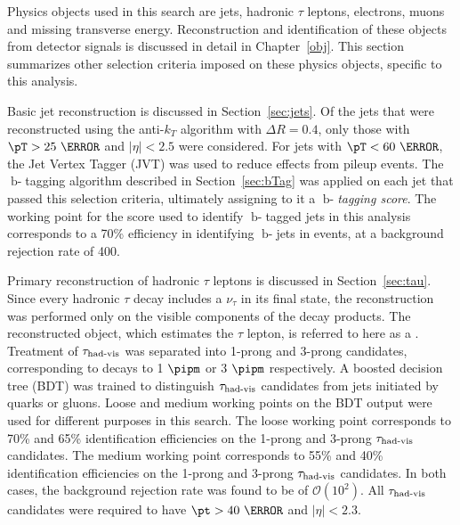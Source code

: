 \par Physics objects used in this search are jets, hadronic $\tau$ leptons, electrons, 
muons and missing transverse energy. Reconstruction and identification of these objects 
from detector signals is discussed in detail in Chapter~\ref{obj}. This section summarizes other 
selection criteria imposed on these physics objects, specific to this analysis. 

\par Basic jet reconstruction is discussed in Section~\ref{sec:jets}. Of the  
jets that were reconstructed using the anti-$k_T$ algorithm with $\Delta R=0.4$, only those 
with $\pT>25~\GeV$ and $|\eta|<2.5$ were considered. For jets with $\pT<60~\GeV$, the Jet Vertex 
Tagger (JVT) was used to reduce effects from pileup events. The $\operatorname{b-}$tagging algorithm 
described in Section~\ref{sec:bTag} was applied on each jet that passed this selection criteria, ultimately 
assigning to it a {\it $\operatorname{b-}$tagging score}. The working point for the score used to identify $\operatorname{b-}$tagged 
jets in this analysis corresponds to a 70\% efficiency in identifying $\operatorname{b-}$jets 
in \ttbar events, at a background rejection rate of 400.   

\par Primary reconstruction of hadronic $\tau$ leptons is discussed in Section~\ref{sec:tau}. 
Since every hadronic $\tau$ decay includes a $\nu_\tau$ in its final state, the reconstruction 
was performed only on the visible components of the decay products. The reconstructed object, which 
estimates the $\tau$ lepton, is referred to here as a \tauvis.   
Treatment of $\tau_{\text{had-vis}}$ was separated into 1-prong and 3-prong candidates, corresponding to decays 
to 1 $\pipm$ or 3 $\pipm$ respectively.  A boosted decision 
tree (BDT) was trained to distinguish $\tau_{\text{had-vis}}$ candidates from jets initiated by quarks or gluons. 
Loose and medium working points on the BDT output were used for different purposes in this search. 
The loose working point corresponds to 70\% and 65\% identification efficiencies on the 1-prong and 3-prong 
$\tau_{\text{had-vis}}$ candidates. The medium working point corresponds to 55\% and 40\% identification efficiencies on 
the 1-prong and 3-prong $\tau_{\text{had-vis}}$ candidates. In both cases, the background rejection rate 
was found to be of $\mathcal{O}(10^2)$. All $\tau_{\text{had-vis}}$ candidates were required to have $\pt>40~\GeV$ and $|\eta|<2.3$. 

